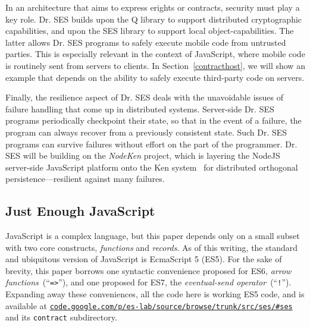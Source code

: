 \documentclass{llncs}
\newcommand{\myurl}[1]{{\href{http://#1}{\texttt{#1}}}}
\begin{document}
In an architecture that aims to express erights or contracts, security must play a key role. Dr. SES builds upon the Q library to support distributed cryptographic capabilities, and upon the SES library to support local object-capabilities. The latter allows Dr. SES programs to safely execute mobile code from untrusted parties.
This is especially relevant in the context of JavaScript, where mobile code is routinely sent from servers to clients. In Section~\ref{contracthost}, we will show an example that  depends on the ability to safely execute third-party code on servers.

Finally, the resilience aspect of Dr. SES deals with the unavoidable issues of failure handling that come up in distributed systems. 
Server-side Dr. SES programs periodically checkpoint their state, so that in the event of a failure, the program can always recover from a previously consistent state. Such Dr. SES programs can survive failures without effort on the part of the programmer. Dr. SES will be building on the \emph{NodeKen} project, which is layering the NodeJS server-side JavaScript platform onto the Ken system~\cite{Yoo:CKen} for distributed orthogonal persistence---resilient against many failures.





\subsection{Just Enough JavaScript}
\label{enoughjs}

JavaScript is a complex language, but this paper depends only on a small subset with two core constructs, \emph{functions} and \emph{records}. As of this writing, the standard and ubiquitous version of JavaScript is EcmaScript 5 (ES5). For the sake of brevity, this paper borrows one syntactic convenience proposed for ES6, \emph{arrow functions}~(``{\tt =>}''), and one proposed for ES7, the \emph{eventual-send operator}~(``{\tt !}''). Expanding away these conveniences, all the code here is working ES5 code, and is available at \myurl{code.google.com/p/es-lab/source/browse/trunk/src/ses/\#ses} and its {\tt contract} subdirectory.
\end{document}
